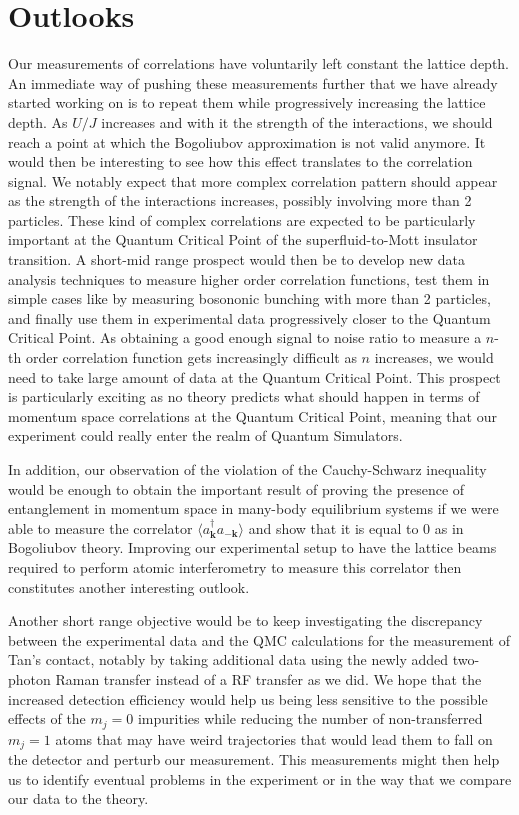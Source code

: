 \section*{Outlooks}

Our measurements of \kmk correlations have voluntarily left constant the lattice depth. An immediate way of pushing these measurements further that we have already started working on is to repeat them while progressively increasing the lattice depth. As $U/J$ increases and with it the strength of the interactions, we should reach a point at which the Bogoliubov approximation is not valid anymore. It would then be interesting to see how this effect translates to the \kmk correlation signal. We notably expect that more complex correlation pattern should appear as the strength of the interactions increases, possibly involving more than 2 particles. These kind of complex correlations are expected to be particularly important at the Quantum Critical Point of the superfluid-to-Mott insulator transition. A short-mid range prospect would then be to develop new data analysis techniques to measure higher order correlation functions, test them in simple cases like by measuring bosononic bunching with more than 2 particles, and finally use them in experimental data progressively closer to the Quantum Critical Point. As obtaining a good enough signal to noise ratio to measure a $n$-th order correlation function gets increasingly difficult as $n$ increases, we would need to take large amount of data at the Quantum Critical Point. This prospect is particularly exciting as no theory predicts what should happen in terms of momentum space correlations at the Quantum Critical Point, meaning that our experiment could really enter the realm of Quantum Simulators. 

In addition, our observation of the violation of the Cauchy-Schwarz inequality would be enough to obtain the important result of proving the presence of entanglement in momentum space in many-body equilibrium systems if we were able to measure the correlator  $\langle a^{\dagger}_{\bm k} a_{-\bm k} \rangle$ and show that it is equal to 0 as in Bogoliubov theory. Improving our experimental setup to have the lattice beams required to perform atomic interferometry to measure this correlator then constitutes another interesting outlook.

Another short range objective would be to keep investigating the discrepancy between the experimental data and the QMC calculations for the measurement of Tan's contact, notably by taking additional data using the newly added two-photon Raman transfer instead of a RF transfer as we did. We hope that the increased detection efficiency would help us being less sensitive to the possible effects of the $m_j=0$ impurities while reducing the number of non-transferred $m_j=1$ atoms that may have weird trajectories that would lead them to fall on the detector and perturb our measurement. This measurements might then help us to identify eventual problems in the experiment or in the way that we compare our data to the theory.

